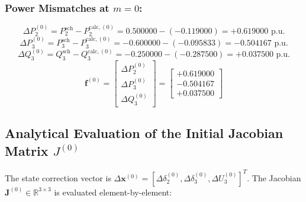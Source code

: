\documentclass[12pt,a4paper,oneside]{report}
\begin{document}
\subsubsection{Power Mismatches at $m = 0$:}
\begin{equation}
\Delta P_2^{(0)} = P_2^{\text{sch}} - P_2^{\text{calc},(0)} = 0.500000 - (-0.119000) = +0.619000\text{ p.u.}
\end{equation}
\begin{equation}
\Delta P_3^{(0)} = P_3^{\text{sch}} - P_3^{\text{calc},(0)} = -0.600000 - (-0.095833) = -0.504167\text{ p.u.}
\end{equation}
\begin{equation}
\Delta Q_3^{(0)} = Q_3^{\text{sch}} - Q_3^{\text{calc},(0)} = -0.250000 - (-0.287500) = +0.037500\text{ p.u.}
\end{equation}
\begin{equation}
\mathbf{f}^{(0)} = \begin{bmatrix} \Delta P_2^{(0)} \\ \Delta P_3^{(0)} \\ \Delta Q_3^{(0)} \end{bmatrix} = \begin{bmatrix} +0.619000 \\ -0.504167 \\ +0.037500 \end{bmatrix}
\end{equation}

\subsection{Analytical Evaluation of the Initial Jacobian Matrix $J^{(0)}$}
The state correction vector is $\Delta \mathbf{x}^{(0)} = [\Delta \delta_2^{(0)}, \Delta \delta_3^{(0)}, \Delta U_3^{(0)}]^T$. The Jacobian $\mathbf{J}^{(0)} \in \mathbb{R}^{3 \times 3}$ is evaluated element-by-element:
\end{document}

